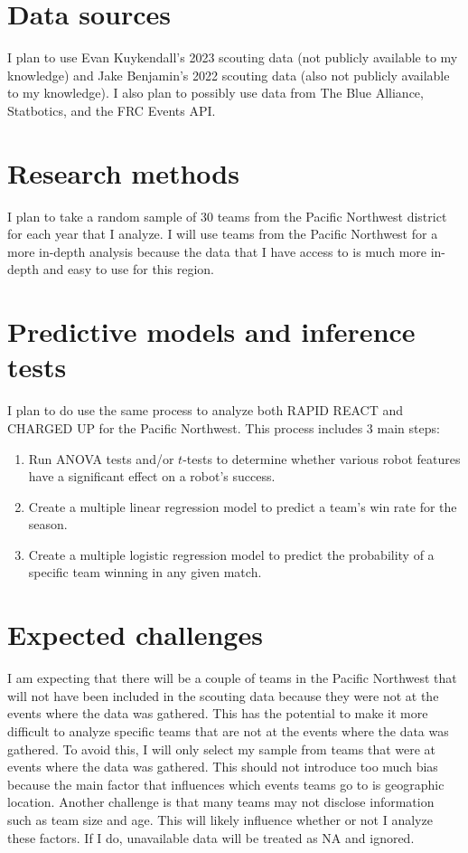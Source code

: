 \documentclass[12pt, letterpaper]{article}
\begin{document}
\section{Data sources}

I plan to use Evan Kuykendall's 2023 scouting data (not publicly available to my knowledge) and Jake Benjamin's 2022
scouting data (also not publicly available to my knowledge). I also plan to possibly use data from The Blue Alliance,
Statbotics, and the FRC Events API.\@ 

\section{Research methods}

I plan to take a random sample of 30 teams from the Pacific Northwest district for each year that I analyze. I will use
teams from the Pacific Northwest for a more in-depth analysis because the data that I have access to is much more
in-depth and easy to use for this region. 

\section{Predictive models and inference tests}

I plan to do use the same process to analyze both RAPID REACT and CHARGED UP for the Pacific Northwest. This process
includes 3 main steps:
\begin{enumerate}
    \item Run ANOVA tests and/or $t$-tests to determine whether various robot features have a significant effect on a
    robot's success.
    \item Create a multiple linear regression model to predict a team's win rate for the season.
    \item Create a multiple logistic regression model to predict the probability of a specific team winning in any 
    given match.
\end{enumerate}

\section{Expected challenges}

I am expecting that there will be a couple of teams in the Pacific Northwest that will not have been included in the
scouting data because they were not at the events where the data was gathered. This has the potential to make it more
difficult to analyze specific teams that are not at the events where the data was gathered. To avoid this, I will only
select my sample from teams that were at events where the data was gathered. This should not introduce too much bias
because the main factor that influences which events teams go to is geographic location. Another challenge is that many
teams may not disclose information such as team size and age. This will likely influence whether or not I analyze these
factors. If I do, unavailable data will be treated as NA and ignored. 
\end{document}
